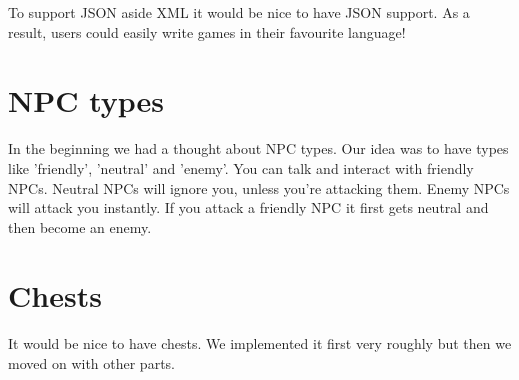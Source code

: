 To support JSON aside XML it would be nice to have JSON support. As a result, users could easily write games in their favourite language!

\section{NPC types}

In the beginning we had a thought about NPC types. Our idea was to have types like 'friendly', 'neutral' and 'enemy'. You can talk and interact with friendly NPCs. Neutral NPCs will ignore you, unless you're attacking them. Enemy NPCs will attack you instantly. If you attack a friendly NPC it first gets neutral and then become an enemy.

\section{Chests}

It would be nice to have chests. We implemented it first very roughly but then we moved on with other parts.

